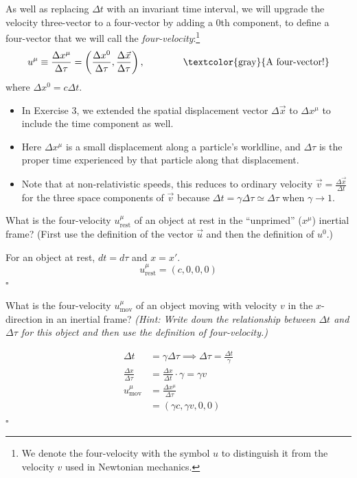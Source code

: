 \documentclass[11pt, letterpaper, openany]{book}
\newenvironment{exercise}[1][Exercise]{%
  \tcolorbox[blanker, breakable, left=1em,
    before skip=1em, after skip=1em,
    borderline west={3pt}{0pt}{PhysNavy},
    colback=PhysCream,
    before upper={\textcolor{PhysNavy}{\sffamily\bfseries #1:}\space}
  ]%
}{%
  \endtcolorbox%
}
\newenvironment{solution}[1][Solution]{%
  \tcolorbox[blanker, breakable, left=1em,
    before skip=1em, after skip=1em,
    borderline west={2pt}{0pt}{PhysTeal},
    colback=PhysCream,
    before upper={\textcolor{PhysTeal}{\sffamily\bfseries #1.}\space}
  ]%
}{%
  \hfill\textcolor{PhysTeal}{\ensuremath{\square}}\endtcolorbox%
}
\begin{document}
As well as replacing $\Delta t$ with an invariant time interval, we will upgrade the velocity three-vector to a four-vector by adding a 0th component, to define a four-vector that we will call the \textit{four-velocity}:\footnote{We denote the four-velocity with the symbol $u$ to distinguish it from the velocity $v$ used in Newtonian mechanics.}
\[ u^\mu \equiv \frac{\Delta x^\mu}{\Delta \tau} = \left(\frac{\Delta x^0}{\Delta \tau}, \frac{\Delta \vec{x}}{\Delta \tau}\right), \qquad\qquad \text{\textcolor{gray}{A four-vector!}} \]
where $\Delta x^0 = c\Delta t$.

\begin{itemize}
    \item In Exercise 3, we extended the spatial displacement vector $\Delta \vec{x}$ to $\Delta x^\mu$ to include the time component as well.
    \item Here $\Delta x^\mu$ is a small displacement along a particle's worldline, and $\Delta \tau$ is the proper time experienced by that particle along that displacement.
    \item Note that at non-relativistic speeds, this reduces to ordinary velocity $\vec{v} = \frac{\Delta \vec{x}}{\Delta t}$ for the three space components of $\vec{v}$ because $\Delta t = \gamma \Delta \tau \simeq \Delta \tau$ when $\gamma \to 1$.
\end{itemize}

\begin{exercise}[Quick Exercise 5]
What is the four-velocity $u^\mu_{\text{rest}}$ of an object at rest in the ``unprimed'' ($x^\mu$) inertial frame? (First use the definition of the vector $\vec{u}$ and then the definition of $u^0$.)
\end{exercise}
\begin{solution}
For an object at rest, $dt = d\tau$ and $x = x'$.
\[ u^\mu_{\text{rest}} = (c, 0, 0, 0) \]
\end{solution}

\begin{exercise}[Exercise 6]
What is the four-velocity $u^\mu_{\text{mov}}$ of an object moving with velocity $v$ in the $x$-direction in an inertial frame?
\textit{(Hint: Write down the relationship between $\Delta t$ and $\Delta \tau$ for this object and then use the definition of four-velocity.)}
\end{exercise}
\begin{solution}
\begin{align*}
    \Delta t &= \gamma \Delta \tau \implies \Delta \tau = \frac{\Delta t}{\gamma} \\
    \frac{\Delta x}{\Delta \tau} &= \frac{\Delta x}{\Delta t} \cdot \gamma = \gamma v \\
    u^\mu_{\text{mov}} &= \frac{\Delta x^\mu}{\Delta \tau} \\
    &= (\gamma c, \gamma v, 0, 0) \tag*{Use $\Delta x^0 = c\Delta t$.}
\end{align*}
\end{solution}
\end{document}
